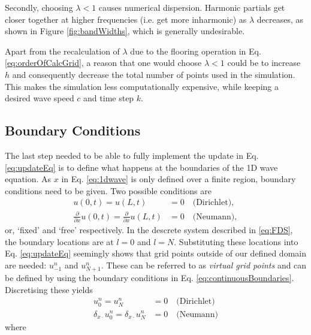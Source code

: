 \documentclass[dvipsnames, preprint]{JASA}
\begin{document}
Secondly, choosing $\lambda < 1$ causes numerical dispersion. Harmonic partials get closer together at higher frequencies (i.e. get more inharmonic) as $\lambda$ decreases, as shown in Figure \ref{fig:bandWidths}, which is generally undesirable.

Apart from the recalculation of $\lambda$ due to the flooring operation in Eq. \eqref{eq:orderOfCalcGrid}, a reason that one would choose $\lambda < 1$ could be to increase $h$ and consequently decrease the total number of points used in the simulation. This makes the simulation less computationally expensive, while keeping a desired wave speed $c$ and time step $k$. 

\subsection{Boundary Conditions}
The last step needed to be able to fully implement the update in Eq. \eqref{eq:updateEq} is to define what happens at the boundaries of the 1D wave equation. As $x$ in Eq. \eqref{eq:1dwave} is only defined over a finite region, boundary conditions need to be given. Two possible conditions are
\begin{subequations}\label{eq:continuousBoundaries}
    \begin{align}
        u(0, t) = u(L, t) &= 0\quad \text{(Dirichlet)},\\
        \frac{\partial}{\partial x} u(0, t) = \frac{\partial}{\partial x} u(L, t) &= 0\quad \text{(Neumann)},
    \end{align}
\end{subequations}
or, `fixed' and `free' respectively. In the descrete system described in \eqref{eq:FDS}, the boundary locations are at $l = 0$ and $l = N$. Substituting these locations into Eq. \eqref{eq:updateEq} seemingly shows that grid points outside of our defined domain are needed: $u_{-1}^n$ and $u_{N+1}^n$. These can be referred to as \textit{virtual grid points} and can be defined by using the boundary conditions in Eq. \eqref{eq:continuousBoundaries}. Discretising these yields
\begin{subequations}
    \begin{align}
        u_0^n = u_N^n &= 0 \quad\text{(Dirichlet)}\label{eq:discreteDirichlet}\\
        \delta_{x\cdot} u_0^n = \delta_{x\cdot} u_N^n &= 0 \quad \text{(Neumann)}\label{eq:discreteNeumann}
    \end{align}
\end{subequations}
where 
\end{document}
